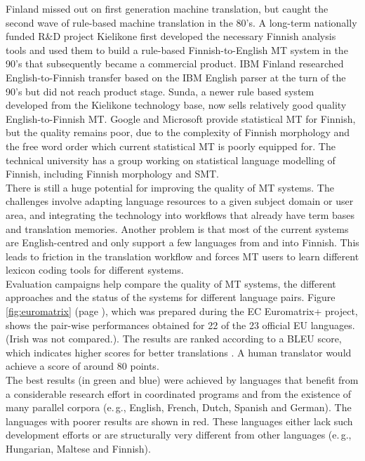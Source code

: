 \begin{multicols}{2}
Finland missed out on first generation machine translation, but caught the
second wave of rule-based machine translation in the 80’s. A long-term
nationally funded R\&D project Kielikone first developed the necessary Finnish
analysis tools and used them to build a rule-based Finnish-to-English MT system
in the 90’s that subsequently became a commercial product. IBM Finland
researched English-to-Finnish transfer based on the IBM English parser at the
turn of the 90’s but did not reach product stage. Sunda, a newer rule based
system developed from the Kielikone technology base, now sells relatively good
quality English-to-Finnish MT. Google and Microsoft provide statistical MT for
Finnish, but the quality remains poor, due to the complexity of Finnish
morphology and the free word order which current statistical MT is poorly
equipped for. The technical university has a group working on statistical
language modelling of Finnish, including Finnish morphology and SMT.\\
There is still a huge potential for improving the quality of MT
systems. The challenges involve adapting language resources to a given
subject domain or user area, and integrating the technology into
workflows that already have term bases and translation
memories. Another problem is that most of the current systems are
English-centred and only support a few languages from and into
Finnish. This leads to friction in the translation workflow and forces
MT users to learn different lexicon coding tools for different
systems.\\
Evaluation campaigns help compare the quality of MT systems, the
different approaches and the status of the systems for different
language pairs. Figure \ref{fig:euromatrix} (page
\pageref{fig:euromatrix}), which was prepared during the EC
Euromatrix+ project, shows the pair-wise performances obtained for 22
of the 23 official EU languages. (Irish was not compared.). The
results are ranked according to a BLEU score, which indicates higher
scores for better translations \cite{BLEU}. A human translator would
achieve a score of around 80 points.\\
The best results (in green and blue) were achieved by languages that
benefit from a considerable research effort in coordinated programs
and from the existence of many parallel corpora (e.\,g., English,
French, Dutch, Spanish and German). The languages with poorer results
are shown in red. These languages either lack such development efforts
or are structurally very different from other languages (e.\,g.,
Hungarian, Maltese and Finnish).



\end{multicols}
